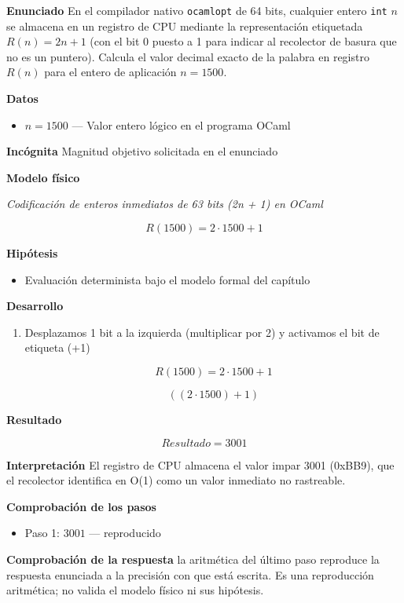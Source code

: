 \documentclass{book}
\begin{document}
\begin{tcolorbox}[title={Problema resuelto}, studiumworked, breakable]

\noindent\textbf{Enunciado}
En el compilador nativo \texttt{ocamlopt} de 64 bits, cualquier entero \texttt{int} \(n\) se almacena en un registro de CPU mediante la representación etiquetada \(R(n) = 2n + 1\) (con el bit 0 puesto a 1 para indicar al recolector de basura que no es un puntero). Calcula el valor decimal exacto de la palabra en registro \(R(n)\) para el entero de aplicación \(n = 1500\).

\noindent\textbf{Datos}
\begin{itemize}
\item $n = 1500$ — Valor entero lógico en el programa OCaml
\end{itemize}

\noindent\textbf{Incógnita}
Magnitud objetivo solicitada en el enunciado

\noindent\textbf{Modelo físico}

\noindent\textit{Codificación de enteros inmediatos de 63 bits (2n + 1) en OCaml}

\[
R(1500) = 2 \cdot 1500 + 1
\]

\noindent\textbf{Hipótesis}
\begin{itemize}
\item Evaluación determinista bajo el modelo formal del capítulo
\end{itemize}

\noindent\textbf{Desarrollo}
\begin{enumerate}
\item
Desplazamos 1 bit a la izquierda (multiplicar por 2) y activamos el bit de etiqueta (+1)

\[
R(1500) = 2 \cdot 1500 + 1
\]

\[
\left(\left(2\cdot 1500\right)+1\right)
\]
\end{enumerate}

\noindent\textbf{Resultado}

\[
Resultado = 3001
\]

\noindent\textbf{Interpretación}
El registro de CPU almacena el valor impar 3001 (0xBB9), que el recolector identifica en O(1) como un valor inmediato no rastreable.

\noindent\textbf{Comprobación de los pasos}
\begin{itemize}
\item Paso 1: $3001$ — reproducido
\end{itemize}

\noindent\textbf{Comprobación de la respuesta} la aritmética del último paso reproduce la respuesta enunciada a la precisión con que está escrita. Es una reproducción aritmética; no valida el modelo físico ni sus hipótesis.
\end{tcolorbox}
\end{document}
